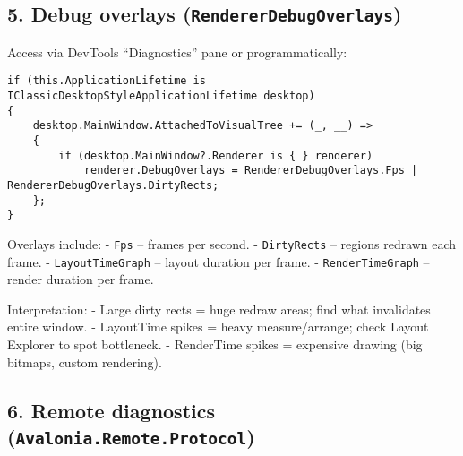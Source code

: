 \subsection{\texorpdfstring{5. Debug overlays
(\texttt{RendererDebugOverlays})}{5. Debug overlays (RendererDebugOverlays)}}\label{debug-overlays-rendererdebugoverlays}

Access via DevTools ``Diagnostics'' pane or programmatically:

\begin{lstlisting}
if (this.ApplicationLifetime is IClassicDesktopStyleApplicationLifetime desktop)
{
    desktop.MainWindow.AttachedToVisualTree += (_, __) =>
    {
        if (desktop.MainWindow?.Renderer is { } renderer)
            renderer.DebugOverlays = RendererDebugOverlays.Fps | RendererDebugOverlays.DirtyRects;
    };
}
\end{lstlisting}

Overlays include: - \passthrough{\lstinline!Fps!} -- frames per second.
- \passthrough{\lstinline!DirtyRects!} -- regions redrawn each frame. -
\passthrough{\lstinline!LayoutTimeGraph!} -- layout duration per frame.
- \passthrough{\lstinline!RenderTimeGraph!} -- render duration per
frame.

Interpretation: - Large dirty rects = huge redraw areas; find what
invalidates entire window. - LayoutTime spikes = heavy measure/arrange;
check Layout Explorer to spot bottleneck. - RenderTime spikes =
expensive drawing (big bitmaps, custom rendering).

\subsection{\texorpdfstring{6. Remote diagnostics
(\texttt{Avalonia.Remote.Protocol})}{6. Remote diagnostics (Avalonia.Remote.Protocol)}}\label{remote-diagnostics-avalonia.remote.protocol}

